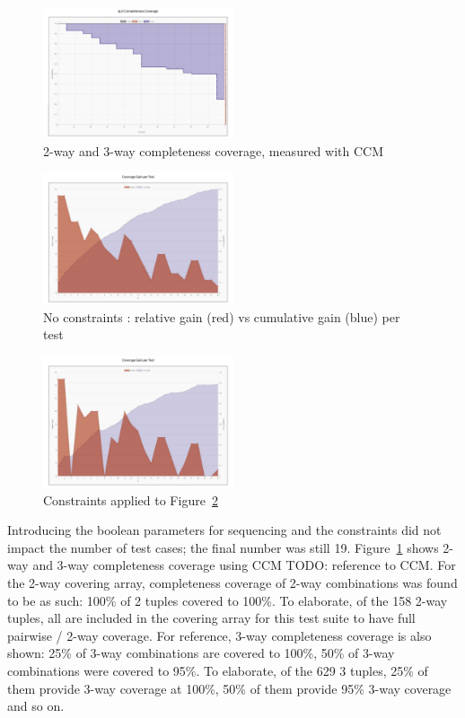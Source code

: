 \documentclass[conference]{IEEEtran}
\newcommand{\todo}[1]{}
\renewcommand{\todo}[1]{{\color{red} TODO: {#1}}}
\begin{document}
	\begin{figure}[!h]
		\includegraphics[width=0.50\textwidth,]{CompletenessCoverage.pdf}
		\caption{2-way and 3-way completeness coverage, measured with CCM}
		\label{fig:CompletenessCoverage}
	\end{figure}

	\begin{figure}[!h]
		\includegraphics[width=0.50\textwidth,]{coverageGainPerTest.pdf}
		\caption{No constraints : relative gain (red) vs cumulative gain (blue) per test}
		\label{fig:coverageGainPerTest}
	\end{figure}

	\begin{figure}[!h]
		\includegraphics[width=0.50\textwidth,]{coverageGainPerTest_withConstraints.pdf}
		\caption{Constraints applied to Figure~\ref{fig:coverageGainPerTest}}
		\label{fig:coverageGainPerTest_withConstraints}
	\end{figure}

	Introducing the boolean parameters for sequencing and the constraints did not impact the number of test cases; the final number was still 19.
	Figure~\ref{fig:CompletenessCoverage} shows 2-way and 3-way completeness coverage using CCM \todo{reference to CCM}. 
	For the 2-way covering array, completeness coverage of 2-way combinations was found to be as such: 100\% of 2 tuples covered to 100\%. 
	To elaborate, of the 158 2-way tuples, all are included in the covering array for this test suite to have full pairwise / 2-way coverage.
	For reference, 3-way completeness coverage is also shown: 25\% of 3-way combinations are covered to 100\%, 50\% of 3-way combinations were covered to 95\%.
	To elaborate, of the 629 3 tuples, 25\% of them provide 3-way coverage at 100\%, 50\% of them provide 95\% 3-way coverage and so on.
\end{document}
